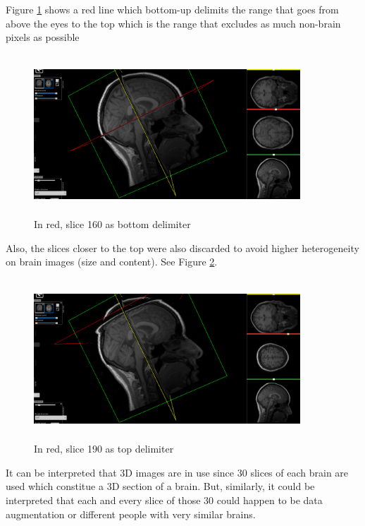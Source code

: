 Figure \ref*{fig:slice160} shows a red line which bottom-up delimits  the range that goes from above the eyes to the top which is the range that excludes as much non-brain pixels as possible

\begin{figure}[ht]
    \centering
    \includegraphics[width = 10cm, height = 6cm]{images/nifti-slice160.png}
    \caption[Slice 160 as bottom delimiter]{In red, slice 160 as bottom delimiter}
    \label{fig:slice160}
\end{figure}

Also, the slices closer to the top were also discarded to avoid higher heterogeneity on brain images (size and content). See Figure \ref*{fig:slice190}.

\begin{figure}[ht]
    \centering
    \includegraphics[width = 10cm, height = 6cm]{images/nifti-slice190.png}
    \caption[Slice 190 as top delimiter]{In red, slice 190 as top delimiter}
    \label{fig:slice190}
\end{figure}

It can be interpreted that 3D images are in use since 30 slices of each brain are used which constitue a 3D section of a brain. But, similarly, it could be interpreted that each and every slice of those 30 could happen to be data augmentation or different people with very similar brains.

